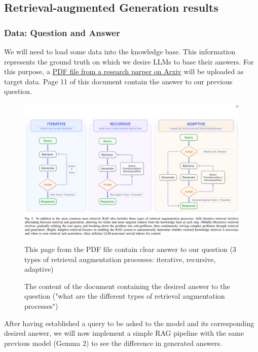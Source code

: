 \subsection{Retrieval-augmented Generation results}
\subsubsection{Data: Question and Answer}
We will need to load some data into the knowledge base. This information represents the ground truth on which we desire LLMs to base their answers.\newline
For this purpose, a \href{https://arxiv.org/abs/2312.10997}{PDF file from a research parper on Arxiv} will be uploaded as target data. Page 11 of this document contain the answer to our previous question.
\begin{figure}[htbp]
    \centering
    \includegraphics[width=\linewidth]{./figures/toberetrieved.png}
    \caption{The content of the document containing the desired answer to the question ("what are the different types of retrieval augmentation processes")}
    \begin{flushleft}
        \small This page from the PDF file contain clear answer to our question (3 types of retrieval augmentation processes: iterative, recursive, adaptive)
    \end{flushleft}
\end{figure}\newline
After having established a query to be asked to the model and its corresponding desired answer, we will now implement a simple RAG pipeline with the same previous model (Gemma 2) to see the difference in generated answers.\newpage
